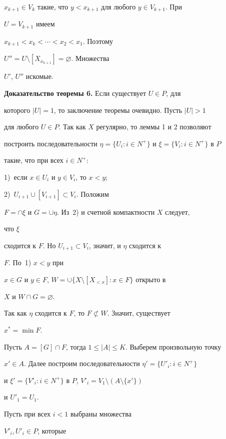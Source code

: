 $x_{k+1}\in V_k$ такие, что $y<x_{k+1}$ для любого $y\in V_{k+1}$. При 


$U=V_{k+1}$ имеем  


$x_{k+1}<x_k<\dotsb<x_2<x_1$. Поэтому 


$U''=U\setminus[X_{x_{k+1}}]=\varnothing$. Множества 


$U'$, $U''$ искомые. 


\medskip 


 


{\bf Доказательство теоремы 6.} Если существует $U\in P$, для  


которого $|U|=1$, то заключение теоремы очевидно. Пусть $|U|>1$ 


для любого $U\in P$. Так как $X$ регулярно, то леммы 1 и 2 позволяют  


построить последовательности $\eta=\{U_i:i\in N^+\}$ и $\xi=\{V_i:i\in 


N^+\}$ в $P$ 


такие, что при всех $i\in N^+$:


1)~если $x\in U_i$ и $y\in V_i$, то $x<y$; 


2)~$U_{i+1}\cup[V_{i+1}]\subset V_i$. Положим  


$F=\cap\xi$ и $G=\cup\eta$. Из~2) и счетной компактности $X$ следует, 


что $\xi$ 


сходится к $F$. Но $U_{i+1}\subset V_i$, значит, и $\eta$ сходится к 


$F$. По~1) $x<y$ при 


$x\in G$ и $y\in F$, $W=\cup\{X\setminus[X_{<x}]:x\in F\}$ открыто в 


$X$ и $W\cap G=\varnothing$. 


Так как $\eta$ сходится к $F$, то $F\not\subset W$. Значит, существует 


$x^*=\min F$. 


Пусть $A=[G]\cap F$, тогда $1\le|A|\le K$. Выберем произвольную точку  


$x'\in A$. Далее построим последовательности $\eta'=\{U'_i:i\in N^+\}$ 


и $\xi'=\{V'_i:i\in N^+\}$ в $P$, $V'_i=V_1\setminus(A\setminus\{x'\})$


и $U'_1=U_1$. 


 


Пусть при всех $i<1$ выбраны множества 


$V'_i,U'_i\in P$, которые  


